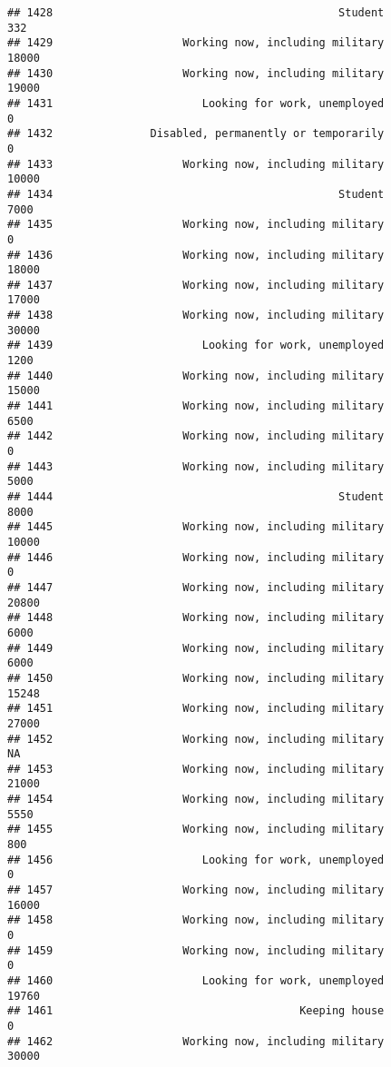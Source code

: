\documentclass[]{book}
\theoremstyle{definition}
\theoremstyle{definition}
\theoremstyle{remark}
\begin{document}
\begin{verbatim}
## 1428                                            Student             332
## 1429                    Working now, including military           18000
## 1430                    Working now, including military           19000
## 1431                       Looking for work, unemployed               0
## 1432               Disabled, permanently or temporarily               0
## 1433                    Working now, including military           10000
## 1434                                            Student            7000
## 1435                    Working now, including military               0
## 1436                    Working now, including military           18000
## 1437                    Working now, including military           17000
## 1438                    Working now, including military           30000
## 1439                       Looking for work, unemployed            1200
## 1440                    Working now, including military           15000
## 1441                    Working now, including military            6500
## 1442                    Working now, including military               0
## 1443                    Working now, including military            5000
## 1444                                            Student            8000
## 1445                    Working now, including military           10000
## 1446                    Working now, including military               0
## 1447                    Working now, including military           20800
## 1448                    Working now, including military            6000
## 1449                    Working now, including military            6000
## 1450                    Working now, including military           15248
## 1451                    Working now, including military           27000
## 1452                    Working now, including military              NA
## 1453                    Working now, including military           21000
## 1454                    Working now, including military            5550
## 1455                    Working now, including military             800
## 1456                       Looking for work, unemployed               0
## 1457                    Working now, including military           16000
## 1458                    Working now, including military               0
## 1459                    Working now, including military               0
## 1460                       Looking for work, unemployed           19760
## 1461                                      Keeping house               0
## 1462                    Working now, including military           30000

\end{verbatim}
\end{document}
